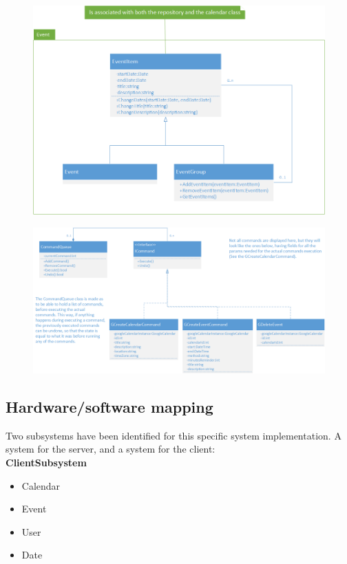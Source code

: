 \documentclass[10pt]{report}
\numberwithin{equation}{section} %
\numberwithin{figure}{section} %
\numberwithin{table}{section} %
\begin{document}
\begin{figure}[H]
  \includegraphics[scale=0.6]{figures/composite.png}
\end{figure}

\begin{figure}[H]
  \includegraphics[scale=0.6]{figures/command.png}
\end{figure}

\subsection{Hardware/software mapping}
Two subsystems have been identified for this specific system implementation. A
system for the server, and a system for the client:\\
\textbf{ClientSubsystem}
\begin{itemize}
\item Calendar
\item Event
\item User
\item Date
\end{itemize}
\end{document}
